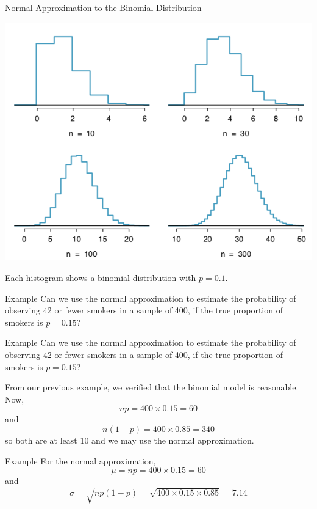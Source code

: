 \begin{frame}{Normal Approximation to the Binomial Distribution}
    \begin{center}
        \includegraphics[scale=0.3]{images/nrmbin.png}
    \end{center}
    Each histogram shows a binomial distribution with $p=0.1$.
\end{frame}

\begin{frame}{Example}
    Can we use the normal approximation to estimate the probability of observing 42 or fewer smokers in a sample of 400, if the true proportion of smokers is $p = 0.15$?
\end{frame}

\begin{frame}{Example}
    Can we use the normal approximation to estimate the probability of observing 42 or fewer smokers in a sample of 400, if the true proportion of smokers is $p = 0.15$?
    
    \vspace{12pt}From our previous example, we verified that the binomial model is reasonable. Now,
    \[
        np = 400\times0.15=60
    \]
    and
    \[
        n(1-p) = 400\times 0.85 = 340
    \]
    so both are at least 10 and we may use the normal approximation.
\end{frame}

\begin{frame}{Example}
    For the normal approximation,
    \[
        \mu = np = 400\times0.15 = 60
    \]
    and 
    \[
        \sigma = \sqrt{np(1 − p)} = \sqrt{400\times0.15\times0.85} = 7.14
    \]
\end{frame}

